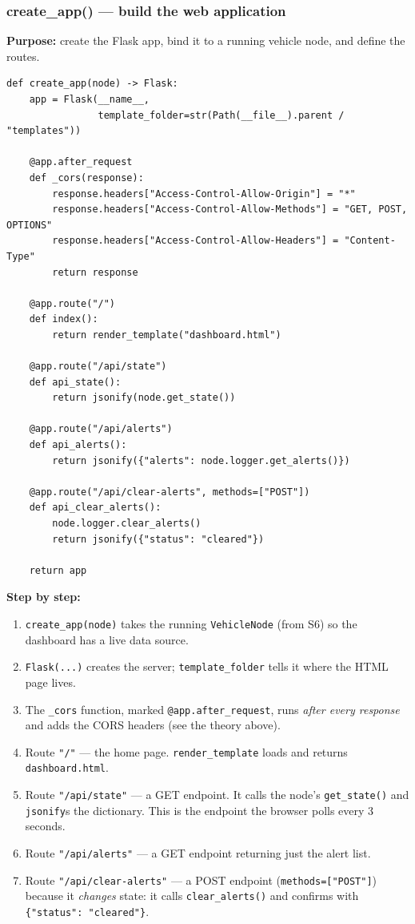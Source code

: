 \documentclass[11pt,a4paper]{report}
\begin{document}
\subsubsection*{create\_app() --- build the web application}
\textbf{Purpose:} create the Flask app, bind it to a running vehicle node, and
define the routes.
\begin{lstlisting}[style=py,caption={dashboard/app.py --- the whole Flask application.}]
def create_app(node) -> Flask:
    app = Flask(__name__,
                template_folder=str(Path(__file__).parent / "templates"))

    @app.after_request
    def _cors(response):
        response.headers["Access-Control-Allow-Origin"] = "*"
        response.headers["Access-Control-Allow-Methods"] = "GET, POST, OPTIONS"
        response.headers["Access-Control-Allow-Headers"] = "Content-Type"
        return response

    @app.route("/")
    def index():
        return render_template("dashboard.html")

    @app.route("/api/state")
    def api_state():
        return jsonify(node.get_state())

    @app.route("/api/alerts")
    def api_alerts():
        return jsonify({"alerts": node.logger.get_alerts()})

    @app.route("/api/clear-alerts", methods=["POST"])
    def api_clear_alerts():
        node.logger.clear_alerts()
        return jsonify({"status": "cleared"})

    return app
\end{lstlisting}
\textbf{Step by step:}
\begin{enumerate}
  \item \texttt{create\_app(node)} takes the running \texttt{VehicleNode} (from
        S6) so the dashboard has a live data source.
  \item \texttt{Flask(...)} creates the server; \texttt{template\_folder} tells
        it where the HTML page lives.
  \item The \texttt{\_cors} function, marked \texttt{@app.after\_request}, runs
        \emph{after every response} and adds the CORS headers (see the theory
        above).
  \item Route \texttt{"/"} --- the home page. \texttt{render\_template} loads and
        returns \texttt{dashboard.html}.
  \item Route \texttt{"/api/state"} --- a GET endpoint. It calls the node's
        \texttt{get\_state()} and \texttt{jsonify}s the dictionary. This is the
        endpoint the browser polls every 3 seconds.
  \item Route \texttt{"/api/alerts"} --- a GET endpoint returning just the alert
        list.
  \item Route \texttt{"/api/clear-alerts"} --- a POST endpoint
        (\texttt{methods=["POST"]}) because it \emph{changes} state: it calls
        \texttt{clear\_alerts()} and confirms with \texttt{\{"status":
        "cleared"\}}.
\end{enumerate}
\end{document}
